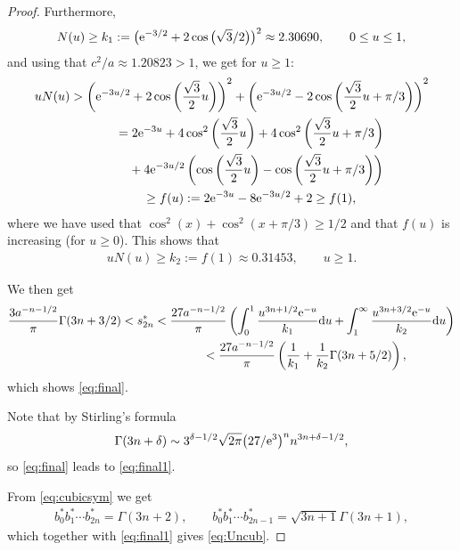 \documentclass[pdftex]{sigma}
\numberwithin{equation}{section}
\begin{document}
\begin{proof}
Furthermore,
\begin{gather*}
N(u)\ge k_1:=\big({\rm e}^{-3/2}+2\cos\big(\sqrt{3}/2\big)\big)^2\approx 2.30690,\qquad 0\le u\le 1,
\end{gather*}
and using that $c^2/a\approx 1.20823>1$, we get for $u\ge 1$:
\begin{gather*}
uN(u) > \left({\rm e}^{-3u/2}+2\cos\left(\frac{\sqrt{3}}{2}u\right)\right)^2+ \left({\rm e}^{-3u/2}-2\cos\left(\frac{\sqrt{3}}{2}u+\pi/3\right)\right)^2\\
\hphantom{uN(u)}{} = 2{\rm e}^{-3u}+4\cos^2\left(\frac{\sqrt{3}}{2}u\right)+4\cos^2\left(\frac{\sqrt{3}}{2}u+\pi/3\right)\\
\hphantom{uN(u)>}{} + 4{\rm e}^{-3u/2}\left(\cos\left(\frac{\sqrt{3}}{2}u\right)-\cos\left(\frac{\sqrt{3}}{2}u+\pi/3\right)\right)\\
\hphantom{uN(u)}{} \ge f(u):=2{\rm e}^{-3u}-8{\rm e}^{-3u/2}+2\ge f(1),
\end{gather*}
where we have used that $\cos^2(x)+\cos^2(x+\pi/3)\ge 1/2$ and that $f(u)$ is increasing (for $u\ge 0$). This shows that
\begin{gather*}
uN(u)\ge k_2:=f(1)\approx 0.31453, \qquad u\ge 1.
\end{gather*}

We then get
\begin{gather*}
 \frac{3a^{-n-1/2}}{\pi}\Gamma(3n+3/2)<s_{2n}^*<\frac{27a^{-n-1/2}}{\pi}\left(\int_0^1
\frac{u^{3n+1/2}{\rm e}^{-u}}{k_1}{\rm d}u +\int_1^\infty\frac{u^{3n+3/2}{\rm e}^{-u}}{k_2}{\rm d}u\right)\\
\hphantom{\frac{3a^{-n-1/2}}{\pi}\Gamma(3n+3/2)<s_{2n}^*}{} <\frac{27a^{-n-1/2}}{\pi}\left(\frac{1}{k_1}+\frac{1}{k_2}\Gamma(3n+5/2)\right),
\end{gather*}
which shows \eqref{eq:final}.

Note that by Stirling's formula
\begin{gather}\label{eq:Stirlingdelta}
\Gamma(3n+\delta)\sim 3^{\delta-1/2} \sqrt{2\pi}\big(27/{\rm e}^3\big)^n n^{3n+\delta-1/2},
\end{gather}
so \eqref{eq:final} leads to \eqref{eq:final1}.

From \eqref{eq:cubicsym} we get
\begin{gather}\label{eq:prodsym}
b_0^{*}b_1^{*}\cdots b_{2n}^{*}=\Gamma(3n+2),\qquad b_0^{*}b_1^{*}\cdots b_{2n-1}^{*}=\sqrt{3n+1}\Gamma(3n+1),
\end{gather}
which together with \eqref{eq:final1} gives \eqref{eq:Uncub}.
\end{proof}
\end{document}
